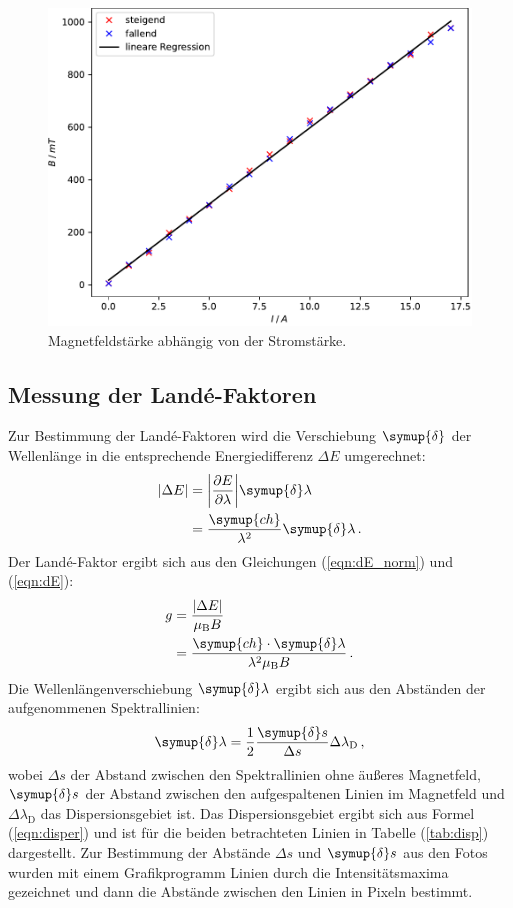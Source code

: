 \begin{figure}
  \centering
  \includegraphics{fig/plot.pdf}
  \caption{Magnetfeldstärke abhängig von der Stromstärke.}
  \label{fig:plot}
\end{figure}

\subsection{Messung der Landé-Faktoren}
Zur Bestimmung der Landé-Faktoren wird die Verschiebung $\symup{\delta}$ der Wellenlänge in die entsprechende Energiedifferenz $\Delta E$ umgerechnet:
\begin{align}
  |\Delta E| &= \biggl|\frac{\partial E}{\partial\lambda}\biggr|\symup{\delta}\lambda \\
          &= \frac{\symup{ch}}{\lambda^2}\symup{\delta}\lambda \,.
  \label{eqn:dE}
\end{align}
Der Landé-Faktor ergibt sich aus den Gleichungen (\ref{eqn:dE_norm}) und (\ref{eqn:dE}):
\begin{align}
  g &= \frac{|\Delta E|}{\mu_\text{B} B} \\
    &= \frac{\symup{ch}\cdot\symup{\delta}\lambda}{\lambda^2\mu_\text{B}B}\,.
\end{align}
Die Wellenlängenverschiebung $\symup{\delta}\lambda$ ergibt sich aus den Abständen der aufgenommenen Spektrallinien:
\begin{equation}
  \symup{\delta}\lambda = \frac{1}{2}\frac{\symup{\delta}s}{\Delta s}\Delta \lambda_\text{D}\,,
  \label{eq:versch}
\end{equation}
wobei $\Delta s$ der Abstand zwischen den Spektrallinien ohne äußeres Magnetfeld, $\symup{\delta} s$ der Abstand zwischen den aufgespaltenen Linien
im Magnetfeld und $\Delta\lambda_\text{D}$ das Dispersionsgebiet ist.
Das Dispersionsgebiet ergibt sich aus Formel (\ref{eqn:disper}) %
und ist für die beiden betrachteten Linien in Tabelle (\ref{tab:disp}) dargestellt.
Zur Bestimmung der Abstände $\Delta s$ und $\symup{\delta}s$ aus den Fotos wurden mit einem Grafikprogramm Linien durch die Intensitätsmaxima gezeichnet
und dann die Abstände zwischen den Linien in Pixeln bestimmt.

